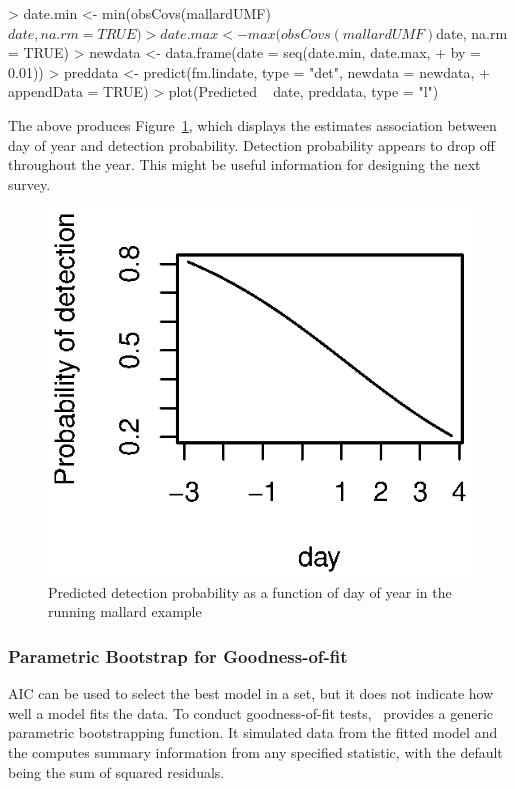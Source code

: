 \documentclass[article,shortnames]{jss}
\newcommand{\um}{\pkg{unmarked}}
\begin{document}
\begin{Schunk}
\begin{Sinput}
> date.min <- min(obsCovs(mallardUMF)$date, na.rm = TRUE)
> date.max <- max(obsCovs(mallardUMF)$date, na.rm = TRUE)
> newdata <- data.frame(date = seq(date.min, date.max, 
+     by = 0.01))
> preddata <- predict(fm.lindate, type = "det", newdata = newdata, 
+     appendData = TRUE)
> plot(Predicted ~ date, preddata, type = "l")
\end{Sinput}
\end{Schunk}

The above produces Figure~\ref{fig:preddet}, which displays the
estimates association between day of year and detection probability.
Detection probability appears to drop off throughout the year.
This might be useful information for designing the next survey.

\begin{figure}
  \centering
\includegraphics{unmarked-025}
\caption{Predicted detection probability as a function of day of year
  in the running mallard example}
\label{fig:preddet}
\end{figure}

\subsubsection{Parametric Bootstrap for Goodness-of-fit}

AIC can be used to select the best model in a set, but it does not indicate
how well a model fits the data.  
To conduct goodness-of-fit tests, \um\ provides a generic
parametric bootstrapping function.  It simulated data from the fitted
model and the computes summary information from any specified
statistic, with the default being the sum of squared residuals.
\end{document}
